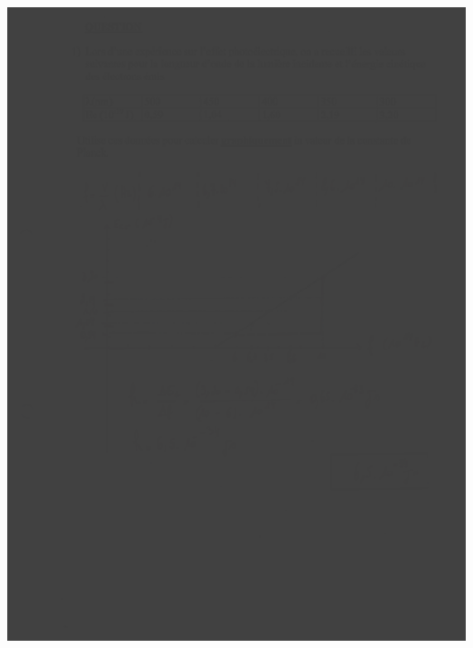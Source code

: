 {\includegraphics[width=17.498cm,height=24.13cm]{Pictures/10000001000002570000033BD2AA64816C97C97B.png}

}
